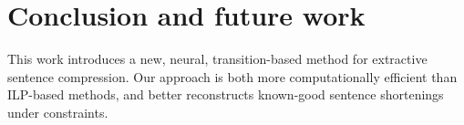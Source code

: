 \documentclass[11pt,a4paper]{article}
\begin{document}
\section{Conclusion and future work}

This work introduces a new, neural, transition-based method for extractive sentence compression. Our approach is both more computationally efficient than ILP-based methods, and better reconstructs known-good sentence shortenings under constraints. 




%



\end{document}
